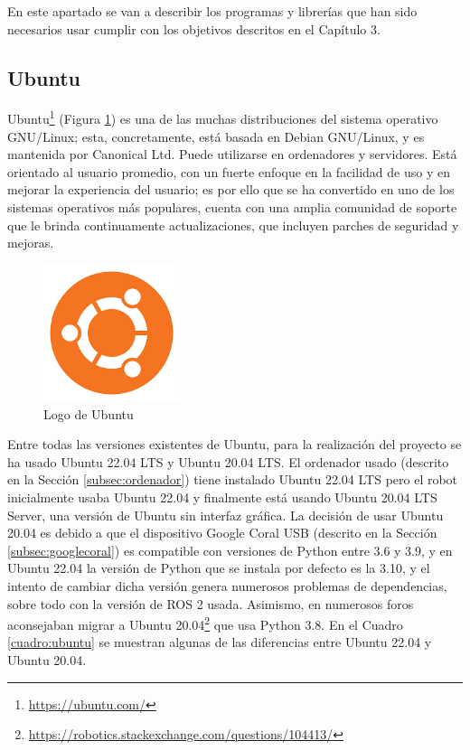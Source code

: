 En este apartado se van a describir los programas y librerías que han sido necesarios usar cumplir con los objetivos descritos en el Capítulo 3.

\subsection{Ubuntu}
\label{subsec:ubuntu}

Ubuntu\footnote{\url{https://ubuntu.com/}} (Figura \ref{fig:ubuntu}) es una de las muchas distribuciones del sistema operativo GNU/Linux; esta, concretamente, está basada en Debian GNU/Linux, y es mantenida por Canonical Ltd. Puede utilizarse en ordenadores y servidores. Está orientado al usuario promedio, con un fuerte enfoque en la facilidad de uso y en mejorar la experiencia del usuario; es por ello que se ha convertido en uno de los sistemas operativos más populares, cuenta con una amplia comunidad de soporte que le brinda continuamente actualizaciones, que incluyen parches de seguridad y mejoras.

\begin{figure} [h!]
	\begin{center}
		\includegraphics[width=4cm]{figs/ubuntu.png}
	\end{center}
	\caption{Logo de Ubuntu} %
	\label{fig:ubuntu}
\end{figure}


Entre todas las versiones existentes de Ubuntu, para la realización del proyecto se ha usado Ubuntu 22.04 LTS y Ubuntu 20.04 LTS. El ordenador usado (descrito en la Sección \ref{subsec:ordenador}) tiene instalado Ubuntu 22.04 \ac{LTS} pero el robot inicialmente usaba Ubuntu 22.04 y finalmente está usando Ubuntu 20.04 \acs{LTS} Server, una versión de Ubuntu sin interfaz gráfica. La decisión de usar Ubuntu 20.04 es debido a que el dispositivo Google Coral USB (descrito en la Sección \ref{subsec:googlecoral}) es compatible con versiones de Python entre 3.6 y 3.9, y en Ubuntu 22.04 la versión de Python que se instala por defecto es la 3.10, y el intento de cambiar dicha versión genera numerosos problemas de dependencias, sobre todo con la versión de ROS 2 usada. Asimismo, en numerosos foros aconsejaban migrar a Ubuntu 20.04\footnote{\url{https://robotics.stackexchange.com/questions/104413/}} que usa Python 3.8. En el Cuadro \ref{cuadro:ubuntu} se muestran algunas de las diferencias entre Ubuntu 22.04 y Ubuntu 20.04.

